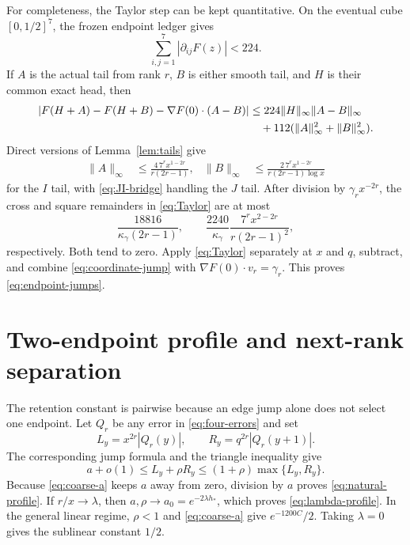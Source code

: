 \documentclass[11pt]{article}
\theoremstyle{definition}
\theoremstyle{remark}
\begin{document}
For completeness, the Taylor step can be kept quantitative.  On the
eventual cube $[0,1/2]^7$, the frozen endpoint ledger gives
\begin{equation}
 \sum_{i,j=1}^7|\partial_{ij}F(z)|<224.
 \label{eq:Hessian}
\end{equation}
If $A$ is the actual tail from rank $r$, $B$ is either smooth tail, and
$H$ is their common exact head, then
\begin{align}
 |F(H+A)-F(H+B)-\nabla F(0)\mathbin{\cdot}(A-B)|
 &\le224\|H\|_\infty\|A-B\|_\infty \notag\\
 &\quad+112(\|A\|_\infty^2+\|B\|_\infty^2).
 \label{eq:Taylor}
\end{align}
Direct versions of Lemma~\ref{lem:tails} give
\begin{align}
 \|A\|_\infty&\le
 \frac{4\,7^rx^{1-2r}}{r(2r-1)},
 &\|B\|_\infty&\le
 \frac{2\,7^rx^{1-2r}}{r(2r-1)\log x}
 \label{eq:tail-norms}
\end{align}
for the $I$ tail, with \eqref{eq:JI-bridge} handling the $J$ tail.  After
division by $\gamma_rx^{-2r}$, the cross and square remainders in
\eqref{eq:Taylor} are at most
\begin{equation}
 \frac{18816}{\kappa_\gamma(2r-1)},
 \qquad
 \frac{2240}{\kappa_\gamma}
 \frac{7^rx^{2-2r}}{r(2r-1)^2},
 \label{eq:Taylor-remainders}
\end{equation}
respectively.  Both tend to zero.  Apply \eqref{eq:Taylor} separately at
$x$ and $q$, subtract, and combine \eqref{eq:coordinate-jump} with
$\nabla F(0)\cdot v_r=\gamma_r$.  This proves
\eqref{eq:endpoint-jumps}.

\section{Two-endpoint profile and next-rank separation}

The retention constant is pairwise because an edge jump alone does not
select one endpoint.  Let $Q_r$ be any error in \eqref{eq:four-errors}
and set
\begin{equation}
 L_y=x^{2r}|Q_r(y)|,\qquad
 R_y=q^{2r}|Q_r(y+1)|.
 \label{eq:L-R}
\end{equation}
The corresponding jump formula and the triangle inequality give
\begin{equation}
 a+o(1)\le L_y+\rho R_y
 \le(1+\rho)\max\{L_y,R_y\}.
 \label{eq:pair-inequality}
\end{equation}
Because \eqref{eq:coarse-a} keeps $a$ away from zero, division by $a$
proves \eqref{eq:natural-profile}.  If $r/x\to\lambda$, then
$a,\rho\to a_0=e^{-2\lambda h_*}$, which proves
\eqref{eq:lambda-profile}.  In the general linear regime, $\rho<1$ and
\eqref{eq:coarse-a} give $e^{-1200C}/2$.  Taking $\lambda=0$ gives the
sublinear constant $1/2$.
\end{document}
